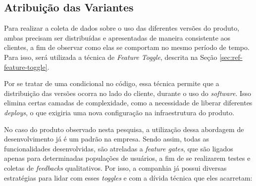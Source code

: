\subsection{Atribuição das Variantes}
\label{subsubsec:variants}

Para realizar a coleta de dados sobre o uso das diferentes versões do produto, ambas precisam ser distribuídas e apresentadas de maneira consistente aos clientes, a fim de observar como elas se comportam no mesmo período de tempo. Para isso, será utilizada a técnica de \textit{Feature Toggle}, descrita na Seção \ref{sec:ref-feature-toggle}.

Por se tratar de uma condicional no código, essa técnica permite que a distribuição das versões ocorra no lado do cliente, durante o uso do \textit{software}. Isso elimina certas camadas de complexidade, como a necessidade de liberar diferentes \textit{deploys}, o que exigiria uma nova configuração na infraestrutura do produto.

No caso do produto observado nesta pesquisa, a utilização dessa abordagem de desenvolvimento já é um padrão na empresa. Sendo assim, todas as funcionalidades desenvolvidas, são atreladas a \textit{feature gates}, que são ligados apenas para determinadas populações de usuários, a fim de se realizarem testes e coletas de \textit{feedbacks} qualitativos. Por isso, a companhia já possui diversas estratégias para lidar com esses \textit{toggles} e com a dívida técnica que eles acarretam:


